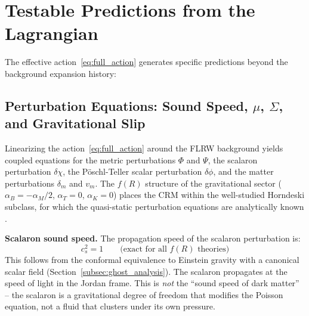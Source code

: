 \documentclass[aps,prd,twocolumn,superscriptaddress,nofootinbib]{revtex4-2}
\begin{document}
\section{Testable Predictions from the Lagrangian}
\label{sec:predictions}

The effective action~\eqref{eq:full_action} generates specific predictions beyond the background expansion history:

\subsection{Perturbation Equations: Sound Speed, $\mu$, $\Sigma$, and Gravitational Slip}
\label{subsec:perturbation_physics}

Linearizing the action~\eqref{eq:full_action} around the FLRW background yields coupled equations for the metric perturbations $\Phi$ and $\Psi$, the scalaron perturbation $\delta\chi$, the P\"oschl-Teller scalar perturbation $\delta\phi$, and the matter perturbations $\delta_m$ and $v_m$. The $f(R)$ structure of the gravitational sector ($\alpha_B = -\alpha_M/2$, $\alpha_T = 0$, $\alpha_K = 0$) places the CRM within the well-studied Horndeski subclass, for which the quasi-static perturbation equations are analytically known \cite{Bellini2014}.

\textbf{Scalaron sound speed.} The propagation speed of the scalaron perturbation is:
\begin{equation}
c_s^2 = 1 \qquad \text{(exact for all $f(R)$ theories)}
\end{equation}
This follows from the conformal equivalence to Einstein gravity with a canonical scalar field (Section~\ref{subsec:ghost_analysis}). The scalaron propagates at the speed of light in the Jordan frame. This is \textit{not} the ``sound speed of dark matter'' -- the scalaron is a gravitational degree of freedom that modifies the Poisson equation, not a fluid that clusters under its own pressure.
\end{document}
